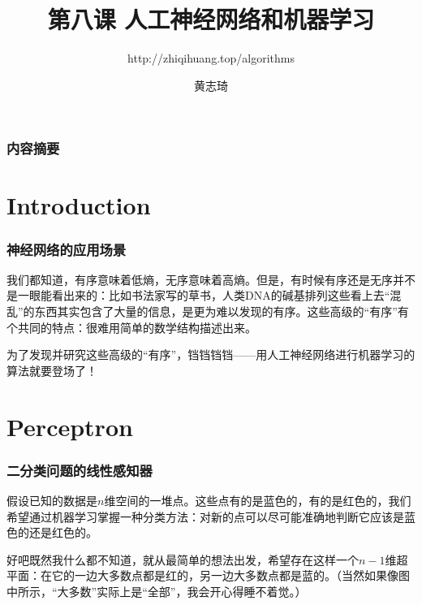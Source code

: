 \documentclass[CJK]{beamer}
\begin{document}
\bch

\title{第八课 人工神经网络和机器学习}
\subtitle{http://zhiqihuang.top/algorithms}
  \author{黄志琦}
  \date{}

  \maketitle

  \begin{frame}
    \frametitle{内容摘要}
    \tableofcontents
  \end{frame}

  \section{Introduction}
  
  \begin{frame}
    \frametitle{神经网络的应用场景}
    我们都知道，有序意味着低熵，无序意味着高熵。但是，有时候有序还是无序并不是一眼能看出来的：比如书法家写的草书，人类DNA的碱基排列这些看上去“混乱”的东西其实包含了大量的信息，是更为难以发现的有序。这些高级的“有序”有个共同的特点：很难用简单的数学结构描述出来。

    \skiplines

    为了发现并研究这些高级的“有序”，铛铛铛铛——用{\blue 人工神经网络}进行{\blue 机器学习}的算法就要登场了！
  \end{frame}


  \section{Perceptron}
  
  \begin{frame}
    \frametitle{二分类问题的线性感知器}
    假设已知的数据是$n$维空间的一堆点。这些点有的是蓝色的，有的是红色的，我们希望通过机器学习掌握一种分类方法：对新的点可以尽可能准确地判断它应该是蓝色的还是红色的。

    
    好吧既然我什么都不知道，就从最简单的想法出发，希望存在这样一个$n-1$维超平面：在它的一边大多数点都是红的，另一边大多数点都是蓝的。（当然如果像图中所示，“大多数”实际上是“全部”，我会开心得睡不着觉。）
    
  \end{frame}
  
\end{document}
